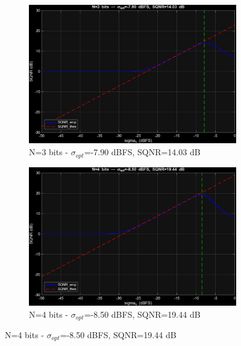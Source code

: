 \documentclass[11pt,a4paper]{article}
\begin{document}
\begin{figure}[H]
  \begin{subfigure}[t]{.4\textwidth}
    \centering
    \includegraphics[width=\linewidth]{img/task3_normal_n3.png}
    \caption{N=3 bits - $\sigma_{opt}$=-7.90 dBFS, SQNR=14.03 dB}
  \end{subfigure}
  \hfill
  \begin{subfigure}[t]{.4\textwidth}
    \centering
    \includegraphics[width=\linewidth]{img/task3_normal_n4.png}
    \caption{N=4 bits - $\sigma_{opt}$=-8.50 dBFS, SQNR=19.44 dB}
  \end{subfigure}

  \medskip


\end{figure}
\end{document}
